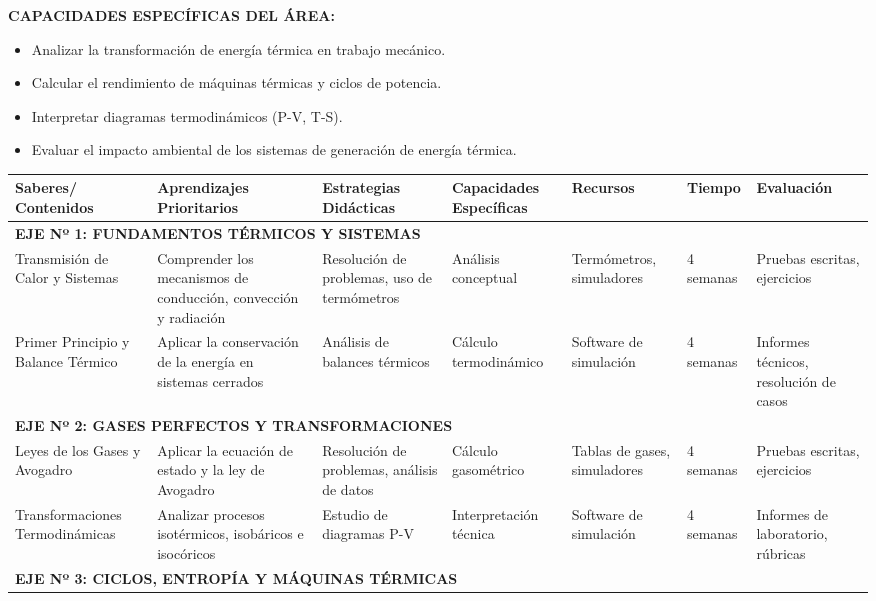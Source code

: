 \documentclass[11pt, a4paper]{article}
\begin{document}
\vspace{1em}
\noindent \textbf{CAPACIDADES ESPECÍFICAS DEL ÁREA:}
\begin{itemize}
\item Analizar la transformación de energía térmica en trabajo mecánico.
\item Calcular el rendimiento de máquinas térmicas y ciclos de potencia.
\item Interpretar diagramas termodinámicos (P-V, T-S).
\item Evaluar el impacto ambiental de los sistemas de generación de energía térmica.
\end{itemize}

\vspace{1em}
\begin{longtable}{|p{2.5cm}|p{3cm}|p{4cm}|p{3cm}|p{2.5cm}|p{1.5cm}|p{3cm}|}
\hline
\rowcolor{gray!20} \textbf{Saberes/ Contenidos} & \textbf{Aprendizajes Prioritarios} & \textbf{Estrategias Didácticas} & \textbf{Capacidades Específicas} & \textbf{Recursos} & \textbf{Tiempo} & \textbf{Evaluación} \\
\hline
\multicolumn{7}{|l|}{\textbf{EJE Nº 1: FUNDAMENTOS TÉRMICOS Y SISTEMAS}} \\
\hline
Transmisión de Calor y Sistemas & Comprender los mecanismos de conducción, convección y radiación & Resolución de problemas, uso de termómetros & Análisis conceptual & Termómetros, simuladores & 4 semanas & Pruebas escritas, ejercicios \\
\hline
Primer Principio y Balance Térmico & Aplicar la conservación de la energía en sistemas cerrados & Análisis de balances térmicos & Cálculo termodinámico & Software de simulación & 4 semanas & Informes técnicos, resolución de casos \\
\hline
\multicolumn{7}{|l|}{\textbf{EJE Nº 2: GASES PERFECTOS Y TRANSFORMACIONES}} \\
\hline
Leyes de los Gases y Avogadro & Aplicar la ecuación de estado y la ley de Avogadro & Resolución de problemas, análisis de datos & Cálculo gasométrico & Tablas de gases, simuladores & 4 semanas & Pruebas escritas, ejercicios \\
\hline
Transformaciones Termodinámicas & Analizar procesos isotérmicos, isobáricos e isocóricos & Estudio de diagramas P-V & Interpretación técnica & Software de simulación & 4 semanas & Informes de laboratorio, rúbricas \\
\hline
\multicolumn{7}{|l|}{\textbf{EJE Nº 3: CICLOS, ENTROPÍA Y MÁQUINAS TÉRMICAS}} \\

\end{longtable}
\end{document}
